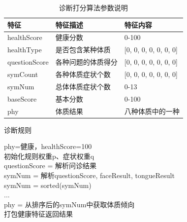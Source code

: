 \begin{table}[h]
    \caption{诊断打分算法参数说明}
    \begin{center}
        \begin{tabular}{lll}
            \toprule
            特征 & 特征描述 & 特征内容 \\ 
            \midrule
            healthScore & 健康分数 & 0-100 \\
            healthType & 是否包含某种体质 & {[}0, 0, 0, 0, 0, 0, 0{]} \\ 
            questionScore & 各种问题的体质得分 & {[}0, 0, 0, 0, 0, 0, 0{]} \\
            symCount & 各种体质症状个数 & {[}0, 0, 0, 0, 0, 0, 0{]} \\
            symNum & 总体体质症状个数 & 0-13 \\
            baseScore & 基本分数 & 0-100 \\
            phy & 体质结果 & 八种体质中的一种\\
            \bottomrule
        \end{tabular}
    \end{center}
    \label{tab:diag-feature}
\end{table}

\begin{algorithm}[htbp]
\caption{诊断规则}%
\label{al:diag}
\LinesNumbered %
phy=健康，healthScore=100\\
初始化规则权重p、症状权重q\\
questionScore = 解析问诊结果\\
symNum = 解析questionScore, faceResult, tongueResult\\
symNum = sorted(symNum)\\ 
...\\
phy = 从排序后的symNum中获取体质倾向\\
打包健康特征返回结果\\
\end{algorithm}

